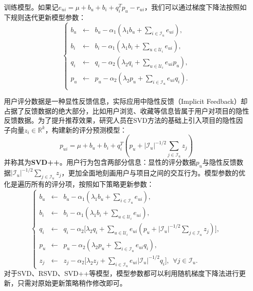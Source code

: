 训练模型。如果记$e_{ui}=\mu + b_u + b_i + q_i^T p_u - r_{ui}$，我们可以通过梯度下降法按照如下规则迭代更新模型参数：
\begin{equation}
    \left\{
        \begin{array}{lcl}
            b_u & \leftarrow & b_u - \alpha_1 (\lambda_1 b_u + \sum\limits_{i\in \mathcal I_u} e_{ui}),\\
            b_i & \leftarrow & b_i - \alpha_1 (\lambda_1 b_i + \sum\limits_{u\in \mathcal U_i} e_{ui}),\\
            q_i & \leftarrow & q_i - \alpha_2 (\lambda_2 q_i + \sum\limits_{u\in \mathcal U_i} e_{ui} p_u),\\
            p_u & \leftarrow & p_u - \alpha_2 (\lambda_2 p_u + \sum\limits_{i\in \mathcal I_u} e_{ui} q_i).\\
        \end{array}
    \right.
\end{equation}

用户评分数据是一种显性反馈信息，实际应用中隐性反馈（Implicit Feedback）却占据了反馈数据的绝大部分，比如用户浏览、收藏等信息皆属于用户对项目的隐性反馈数据。为了提升推荐效果，研究人员在SVD方法的基础上引入项目的隐性因子向量$z_i\in \mathbb R^k$，构建新的评分预测模型：
\begin{equation}
    p_{ui} = \mu + b_u + b_i + q_i^T (p_u + |\mathcal I_u|^{-1/2} \sum\limits_{j\in \mathcal I_u} z_j)
\end{equation}
并称其为\textbf{SVD++}。用户行为包含两部分信息：显性的评分数据$p_u$与隐性反馈数据$|\mathcal I_u|^{-1/2} \sum\limits_{j\in \mathcal I_u} z_j$，更加全面地刻画用户与项目之间的交互行为。模型参数的优化是遍历所有的评分项，按照如下策略更新参数：
\begin{equation}
    \left\{
        \begin{array}{lcl}
            b_u & \leftarrow & b_u - \alpha_1 (\lambda_1 b_u + \sum\limits_{i\in \mathcal I_u} e_{ui}),\\
            b_i & \leftarrow & b_i - \alpha_1 (\lambda_1 b_i + \sum\limits_{u\in \mathcal U_i} e_{ui}),\\
            q_i & \leftarrow & q_i - \alpha_2 \big[\lambda_2 q_i + \sum\limits_{u\in \mathcal U_i} e_{ui} (p_u + |\mathcal I_u|^{-1/2} \sum\limits_{j\in \mathcal I_u} z_j)\big],\\
            p_u & \leftarrow & p_u - \alpha_2 (\lambda_2 p_u + \sum\limits_{i\in \mathcal I_u} e_{ui} q_i),\\
            z_j & \leftarrow & z_j - \alpha_2 \big[\lambda_2 z_j + \sum\limits_{i\in \mathcal I_u} e_{ui} |\mathcal I_u|^{-1/2} q_i\big], ~~\forall j\in \mathcal I_u.
        \end{array}
    \right.
\end{equation}
对于SVD、RSVD、SVD++等模型，模型参数都可以利用随机梯度下降法进行更新，只需对原始更新策略稍作修改即可。

